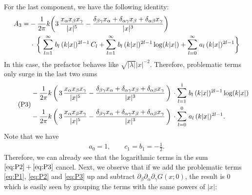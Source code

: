 For the last component, we have the following identity:
\begin{align*}
  A_3 = 
  & - \frac{1}{2\pi} k \bigg( 3\, \frac{x_\alpha x_\beta x_\gamma}{|x|^5} - \frac{\delta_{\beta\gamma} x_\alpha + \delta_{\alpha\gamma} x_\beta + \delta_{\alpha\beta} x_\gamma}{|x|^3} \bigg)  \\
  &\,\cdot\, \bigg\{ 
  \; \mathlarger{\sum}_{l = 1}^\infty \; b_l \, (k|x|)^{2l - 1} \, C_l 
  + \mathlarger{\sum}_{l = 1}^\infty \; b_l \, (k|x|)^{2l - 1} \log(k|x|) 
  + \mathlarger{\sum}_{l = 0}^\infty \; a_l \, (k|x|)^{2l - 1} 
  \bigg\}
\end{align*}
In this case, the prefactor behaves like $\sqrt{|\lambda|} |x|^{-2}$.
Therefore, problematic terms only surge in the last two sums
\begin{align}
  \label{eq:P3}
  \tag{P3}
  \begin{alignedat}{1}
    &- \frac{1}{2\pi} k\, \bigg( \, 3\, \frac{x_\alpha x_\beta x_\gamma}{|x|^5} - \frac{\delta_{\beta\gamma} x_\alpha + \delta_{\alpha\gamma} x_\beta + \delta_{\alpha\beta} x_\gamma}{|x|^3} \, \bigg)
  \, \cdot \mathlarger{\sum}_{l = 1}^1 \; b_l \, (k|x|)^{2l - 1} \log(k|x|)  \\
    &- \frac{1}{2\pi} k\, \bigg( \, 3\, \frac{x_\alpha x_\beta x_\gamma}{|x|^5} - \frac{\delta_{\beta\gamma} x_\alpha + \delta_{\alpha\gamma} x_\beta + \delta_{\alpha\beta} x_\gamma}{|x|^3} \, \bigg)
  \, \cdot \mathlarger{\sum}_{l = 0}^0 \; a_l \, (k|x|)^{2l - 1} .
  \end{alignedat}
\end{align}
Note that we have
\begin{align*}
  a_0 = 1, \qquad c_1 = b_1 = - \frac{1}{2}.
\end{align*}
Therefore, we can already see that the logarithmic terms in the sum $\eqref{eq:P2} + \eqref{eq:P3}$ cancel.
Next, we observe that if we add the problematic terms \eqref{eq:P1}, \eqref{eq:P2} and \eqref{eq:P3} up and subtract $\partial_\beta \partial_\alpha \partial_\gamma G(x; 0)$, the result is $0$ which is easily seen by grouping the terms with the same powers of $|x|$:
